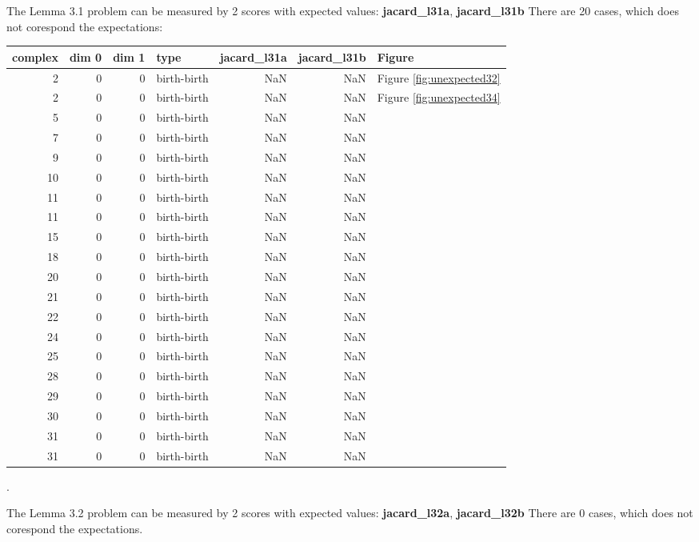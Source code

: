 \documentclass{article}
\begin{document}
    \par The Lemma 3.1 problem can be measured by 2 scores with expected 
    values: \textbf{jacard\_l31a}, \textbf{jacard\_l31b}
    There are 20 cases, which does not corespond the expectations: 
\begin{center}
\begin{tabular}{rrrlrrl}
\toprule
complex & dim 0 & dim 1 & type & jacard\_l31a & jacard\_l31b & Figure \\
\midrule
2 & 0 & 0 & birth-birth & NaN & NaN & Figure \ref{fig:unexpected32} \\
2 & 0 & 0 & birth-birth & NaN & NaN & Figure \ref{fig:unexpected34} \\
5 & 0 & 0 & birth-birth & NaN & NaN &  \\
7 & 0 & 0 & birth-birth & NaN & NaN &  \\
9 & 0 & 0 & birth-birth & NaN & NaN &  \\
10 & 0 & 0 & birth-birth & NaN & NaN &  \\
11 & 0 & 0 & birth-birth & NaN & NaN &  \\
11 & 0 & 0 & birth-birth & NaN & NaN &  \\
15 & 0 & 0 & birth-birth & NaN & NaN &  \\
18 & 0 & 0 & birth-birth & NaN & NaN &  \\
20 & 0 & 0 & birth-birth & NaN & NaN &  \\
21 & 0 & 0 & birth-birth & NaN & NaN &  \\
22 & 0 & 0 & birth-birth & NaN & NaN &  \\
24 & 0 & 0 & birth-birth & NaN & NaN &  \\
25 & 0 & 0 & birth-birth & NaN & NaN &  \\
28 & 0 & 0 & birth-birth & NaN & NaN &  \\
29 & 0 & 0 & birth-birth & NaN & NaN &  \\
30 & 0 & 0 & birth-birth & NaN & NaN &  \\
31 & 0 & 0 & birth-birth & NaN & NaN &  \\
31 & 0 & 0 & birth-birth & NaN & NaN &  \\
\bottomrule
\end{tabular}
\end{center}.
    
    \par The Lemma 3.2 problem can be measured by 2 scores with expected 
    values: \textbf{jacard\_l32a}, \textbf{jacard\_l32b}
    There are 0 cases, which does not corespond the expectations. 
    
\end{document}
